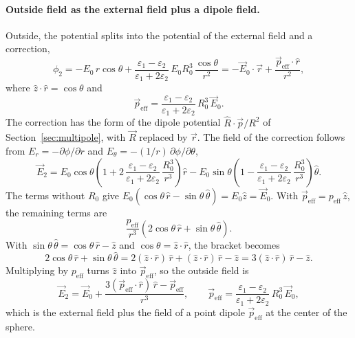 \paragraph{Outside field as the external field plus a dipole field.}
Outside, the potential splits into the potential of the external field and a correction,
\begin{equation*}
    \phi_2 = -E_0\,r\cos\theta + \frac{\varepsilon_1 - \varepsilon_2}{\varepsilon_1 + 2\varepsilon_2}\,E_0R_0^3\,\frac{\cos\theta}{r^2}
    = -\vec E_0\cdot\vec r + \frac{\vec p_{\text{eff}}\cdot\hat r}{r^2},
\end{equation*}
where $\hat z\cdot\hat r = \cos\theta$ and
\begin{equation*}
    \vec p_{\text{eff}} = \frac{\varepsilon_1 - \varepsilon_2}{\varepsilon_1 + 2\varepsilon_2}\,R_0^3\,\vec E_0.
\end{equation*}
The correction has the form of the dipole potential $\hat R\cdot\vec p/R^2$ of Section~\ref{sec:multipole}, with $\vec R$ replaced by $\vec r$. The field of the correction follows from $E_r = -\partial\phi/\partial r$ and $E_\theta = -(1/r)\,\partial\phi/\partial\theta$,
\begin{equation*}
    \vec E_2 = E_0\cos\theta\left(1 + 2\,\frac{\varepsilon_1 - \varepsilon_2}{\varepsilon_1 + 2\varepsilon_2}\,\frac{R_0^3}{r^3}\right)\hat r
    - E_0\sin\theta\left(1 - \frac{\varepsilon_1 - \varepsilon_2}{\varepsilon_1 + 2\varepsilon_2}\,\frac{R_0^3}{r^3}\right)\hat\theta.
\end{equation*}
The terms without $R_0$ give $E_0(\cos\theta\,\hat r - \sin\theta\,\hat\theta) = E_0\hat z = \vec E_0$. With $\vec p_{\text{eff}} = p_{\text{eff}}\,\hat z$, the remaining terms are
\begin{equation*}
    \frac{p_{\text{eff}}}{r^3}\left(2\cos\theta\,\hat r + \sin\theta\,\hat\theta\right).
\end{equation*}
With $\sin\theta\,\hat\theta = \cos\theta\,\hat r - \hat z$ and $\cos\theta = \hat z\cdot\hat r$, the bracket becomes
\begin{equation*}
    2\cos\theta\,\hat r + \sin\theta\,\hat\theta
    = 2(\hat z\cdot\hat r)\,\hat r + (\hat z\cdot\hat r)\,\hat r - \hat z
    = 3(\hat z\cdot\hat r)\,\hat r - \hat z.
\end{equation*}
Multiplying by $p_{\text{eff}}$ turns $\hat z$ into $\vec p_{\text{eff}}$, so the outside field is
\begin{equation}
    \boxed{
    \vec E_2 = \vec E_0 + \frac{3(\vec p_{\text{eff}}\cdot\hat r)\,\hat r - \vec p_{\text{eff}}}{r^3},
    \qquad
    \vec p_{\text{eff}} = \frac{\varepsilon_1 - \varepsilon_2}{\varepsilon_1 + 2\varepsilon_2}\,R_0^3\,\vec E_0,
    }
\end{equation}
which is the external field plus the field of a point dipole $\vec p_{\text{eff}}$ at the center of the sphere.

